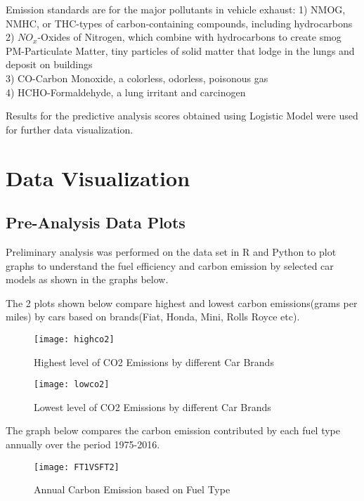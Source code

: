 \documentclass{acm_proc_article-sp}
\begin{document}
Emission standards are for the major pollutants in vehicle exhaust:
1) NMOG, NMHC, or THC-types of carbon-containing compounds, including hydrocarbons \\
2) $NO_{x}$-Oxides of Nitrogen, which combine with hydrocarbons to create smog 
PM-Particulate Matter, tiny particles of solid matter that lodge in the lungs and deposit on buildings \\ 
3) CO-Carbon Monoxide, a colorless, odorless, poisonous gas \\
4) HCHO-Formaldehyde, a lung irritant and carcinogen 

Results for the predictive analysis scores obtained using Logistic Model were used for further data visualization. 

\section{Data Visualization}
\subsection{Pre-Analysis Data Plots}

Preliminary analysis was performed on the data set in R and Python to plot graphs to understand the fuel efficiency and carbon emission by selected car models as shown in the graphs below.

The 2 plots shown below compare highest and lowest carbon emissions(grams per miles) by cars based on brands(Fiat, Honda, Mini, Rolls Royce etc).

\begin{figure}[H]
\centering
\texttt{[image: highco2]}
\caption{Highest level of CO2 Emissions by different Car Brands}
\end{figure}

\begin{figure}[H]
\centering
\texttt{[image: lowco2]}
\caption{Lowest level of CO2 Emissions by different Car Brands}
\end{figure}

The graph below compares the carbon emission contributed by each fuel type annually over the period 1975-2016.

\begin{figure}[H]
\centering
\texttt{[image: FT1VSFT2]}
\caption{Annual Carbon Emission based on Fuel Type}
\end{figure}
\end{document}
